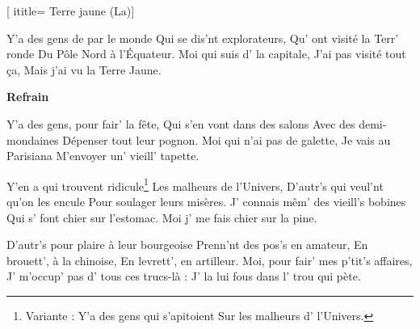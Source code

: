  [
ititle= {Terre jaune (La)}]

\beginverse
Y'a des gens de par le monde
Qui se dis'nt explorateurs,
Qu' ont visité la Terr' ronde
Du Pôle Nord à l'Équateur.
Moi qui suis d' la capitale,
J'ai pas visité tout ça,
Mais j'ai vu la Terre Jaune.
\endverse

\beginchorus
\textbf{Refrain}
\endchorus

\beginverse
Y'a des gens, pour fair' la fête,
Qui s'en vont dans des salons
Avec des demi-mondaines
Dépenser tout leur pognon.
Moi qui n'ai pas de galette,
Je vais au Parisiana
M'envoyer un' vieill' tapette.
\endverse

\beginverse
Y'en a qui trouvent ridicule\footnote {Variante : Y'a des gens qui s'apitoient Sur les malheurs d' l'Univers.}
Les malheurs de l'Univers,
D'autr's qui veul'nt qu'on les encule
Pour soulager leurs misères.
J' connais mêm' des vieill's bobines
Qui s' font chier sur l'estomac.
Moi j' me fais chier sur la pine.
\endverse

\beginverse
D'autr's pour plaire à leur bourgeoise
Prenn'nt des pos's en amateur,
En brouett', à la chinoise,
En levrett', en artilleur.
Moi, pour fair' mes p'tit's affaires,
J' m'occup' pas d' tous ces trucs-là :
J' la lui fous dans l' trou qui pète.
\endverse

\endsong